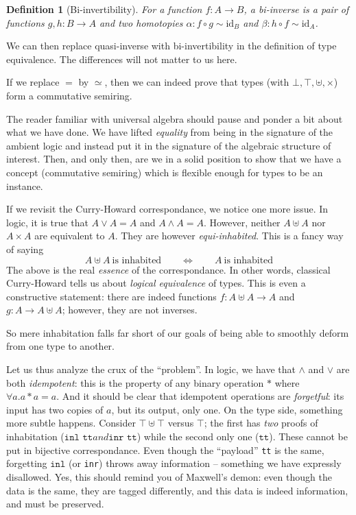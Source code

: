 \documentclass{article}
\newtheorem{defn}{Definition}[section]
\begin{document}
\begin{defn}[Bi-invertibility]
\label{def:biinv}
For a function $f : A \rightarrow B$, a \emph{bi-inverse} is a
pair of functions $g,h : B \rightarrow A$ and two homotopies
$\alpha : f \circ g \sim \mathrm{id}_B$ and
$\beta : h \circ f \sim \mathrm{id}_A$.
\end{defn}
 
\noindent We can then replace quasi-inverse with bi-invertibility in
the definition of type equivalence. The differences will not matter to
us here.

If we replace $=$ by $\simeq$, then we can indeed prove that
types (with $\bot, \top, \uplus, \times$) form a commutative semiring.

The reader familiar with universal algebra should pause
and ponder a bit about what we have done. We have lifted 
\emph{equality} from being in the signature of the ambient logic
and instead put it in the signature of the algebraic structure
of interest. Then, and only then, are we in a solid position
to show that we have a concept (commutative semiring) which is flexible 
enough for types to be an instance.

If we revisit the Curry-Howard correspondance, we notice one
more issue. In logic, it is true that $A \lor A = A$ and
$A \land A = A$. However, neither $A \uplus A$ nor $A \times A$ are
equivalent to $A$. They are however \emph{equi-inhabited}. This is
a fancy way of saying
\[ A \uplus A \ \text{is inhabited} \qquad \Leftrightarrow
  \qquad A \ \text{is inhabited} \]
The above is the real \textit{essence} of the correspondance.
In other words, classical Curry-Howard tells us about
\emph{logical equivalence} of types. This is even a
constructive statement: there are indeed functions
$f : A \uplus A \rightarrow A$ and $g : A \rightarrow A \uplus A$;
however, they are not inverses.

So mere inhabitation falls far short of our goals of being
able to smoothly deform from one type to another.  

Let us thus analyze the crux of the ``problem''. In logic, we have
that $\land$ and $\lor$ are both \emph{idempotent}: this is the
property of any binary operation $*$ where
$\forall a. a * a = a$. And it should be clear that idempotent
operations are \emph{forgetful}: its input has two copies of $a$,
but its output, only one. On the type side, something more subtle
happens. Consider $\top \uplus \top$ versus $\top$; the first has
\emph{two} proofs of inhabitation ($\texttt{inl tt} and \texttt{inr tt}$)
while the second only one ($\texttt{tt}$). These cannot be put in
bijective correspondance. Even though the ``payload'' \texttt{tt}
is the same, forgetting $\texttt{inl}$ (or \texttt{inr}) throws
away information -- something we have expressly disallowed.
Yes, this should remind you of Maxwell's demon: even though the
data is the same, they are tagged differently, and this
data is indeed information, and must be preserved.
\end{document}
